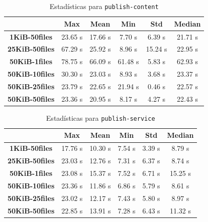 \setlength\tabcolsep{10pt}
\begin{table}[!htbp]
    \centering
    \begin{tabular}{|c|c|c|c|c|c|}
    \hline
    & \textbf{Max} & \textbf{Mean} & \textbf{Min} & \textbf{Std} & \textbf{Median} \\
    \hline
    \textbf{1KiB-50files} & 23.65 s & 17.66 s & 7.70 s & 6.39 s & 21.71 s \\
    \hline
    \textbf{25KiB-50files} & 67.29 s & 25.92 s & 8.96 s & 15.24 s & 22.95 s \\
    \hline
    \textbf{50KiB-1files} & 78.75 s & 66.09 s & 61.48 s & 5.83 s & 62.93 s \\
    \hline
    \textbf{50KiB-10files} & 30.30 s & 23.03 s & 8.93 s & 3.68 s & 23.37 s \\
    \hline
    \textbf{50KiB-25files} & 23.79 s & 22.65 s & 21.94 s & 0.46 s & 22.57 s \\
    \hline
    \textbf{50KiB-50files} & 23.36 s & 20.95 s & 8.17 s & 4.27 s & 22.43 s \\
    \hline
    \end{tabular}
    \caption{Estadísticas para \texttt{publish-content}}
\end{table}

\setlength\tabcolsep{10pt}
\begin{table}[!htbp]
    \centering
    \begin{tabular}{|c|c|c|c|c|c|}
    \hline
    & \textbf{Max} & \textbf{Mean} & \textbf{Min} & \textbf{Std} & \textbf{Median} \\
    \hline
    \textbf{1KiB-50files} & 17.76 s & 10.30 s & 7.54 s & 3.39 s & 8.79 s \\
    \hline
    \textbf{25KiB-50files} & 23.03 s & 12.76 s & 7.31 s & 6.37 s & 8.74 s \\
    \hline
    \textbf{50KiB-1files} & 23.08 s & 15.37 s & 7.52 s & 6.71 s & 15.25 s \\
    \hline
    \textbf{50KiB-10files} & 23.36 s & 11.86 s & 6.86 s & 5.79 s & 8.61 s \\
    \hline
    \textbf{50KiB-25files} & 23.02 s & 12.17 s & 7.43 s & 5.80 s & 8.97 s \\
    \hline
    \textbf{50KiB-50files} & 22.85 s & 13.91 s & 7.28 s & 6.43 s & 11.32 s \\
    \hline
    \end{tabular}
    \caption{Estadísticas para \texttt{publish-service}}
\end{table}

